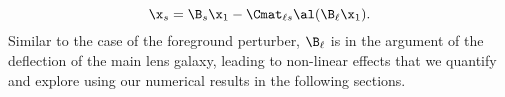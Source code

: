 \begin{equation}
\x_s = \B_s \x_1 - \Cmat_{\ell s} \al(\B_\ell \x_1).
\end{equation}
Similar to the case of the foreground perturber, $\B_\ell$ is in the argument of the deflection of the main lens galaxy, leading to non-linear effects that we quantify and explore using our numerical results in the following sections.